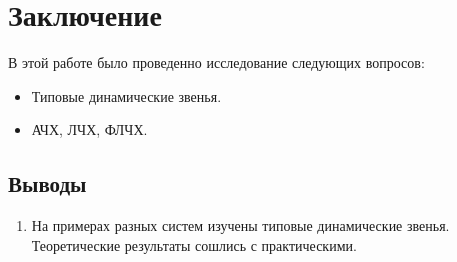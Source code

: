 \documentclass[16pt]{article}
\begin{document}
\newpage
\section{Заключение}
В этой работе было проведенно исследование следующих вопросов:
\begin{itemize}
    \item Типовые динамические звенья.
    \item АЧХ, ЛЧХ, ФЛЧХ.
\end{itemize} 
\subsection{Выводы}
\begin{enumerate}
   \item На примерах разных систем изучены типовые динамические звенья. Теоретические результаты сошлись с практическими.
\end{enumerate}
\end{document}
